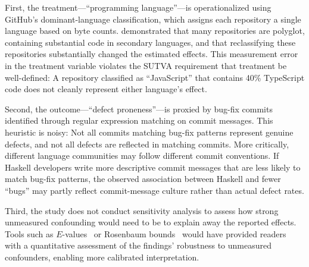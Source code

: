 First, the treatment---``programming language''---is operationalized using GitHub's dominant-language classification, which assigns each repository a single language based on byte counts.
\citet{DBLP:journals/toplas/BergerHMVV19} demonstrated that many repositories are polyglot, containing substantial code in secondary languages, and that reclassifying these repositories substantially changed the estimated effects.
This measurement error in the treatment variable violates the SUTVA requirement that treatment be well-defined: A repository classified as ``JavaScript'' that contains 40\% TypeScript code does not cleanly represent either language's effect.

Second, the outcome---``defect proneness''---is proxied by bug-fix commits identified through regular expression matching on commit messages.
This heuristic is noisy: Not all commits matching bug-fix patterns represent genuine defects, and not all defects are reflected in matching commits.
More critically, different language communities may follow different commit conventions.
If Haskell developers write more descriptive commit messages that are less likely to match bug-fix patterns, the observed association between Haskell and fewer ``bugs'' may partly reflect commit-message culture rather than actual defect rates.

Third, the study does not conduct sensitivity analysis to assess how strong unmeasured confounding would need to be to explain away the reported effects.
Tools such as $E$-values~\cite{vanderweele2017sensitivity} or Rosenbaum bounds~\cite{rosenbaum2002observational} would have provided readers with a quantitative assessment of the findings' robustness to unmeasured confounders, enabling more calibrated interpretation.

